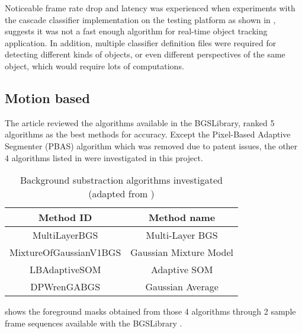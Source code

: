 Noticeable frame rate drop and latency was experienced when experiments with the cascade classifier implementation on the testing platform as shown in , suggests it was not a fast enough algorithm for real-time object tracking application. In addition, multiple classifier definition files were required for detecting different kinds of objects, or even different perspectives of the same object, which would require lots of computations.

\subsection{Motion based}

The article \cite{bgs:article} reviewed the algorithms available in the BGSLibrary, ranked 5 algorithms as the best methods for accuracy. Except the Pixel-Based Adaptive Segmenter (PBAS) algorithm which was removed due to patent issues, the other 4 algorithms listed in  were investigated in this project.

\begin{table}[H]
  \centering
  \begin{tabular}{cc}
  \toprule
  \textbf{Method ID} & \textbf{Method name}\\
  \midrule
  MultiLayerBGS & Multi-Layer BGS \\
  MixtureOfGaussianV1BGS & Gaussian Mixture Model \\
  LBAdaptiveSOM & Adaptive SOM \\
  DPWrenGABGS & Gaussian Average \\
  \bottomrule
  \end{tabular}
  \caption{Background substraction algorithms investigated (adapted from \cite{bgslibrary})}
  \label{Table:bgs}
\end{table}

 shows the foreground masks obtained from those 4 algorithms through 2 sample frame sequences available with the BGSLibrary \cite{bgslibrary}.

